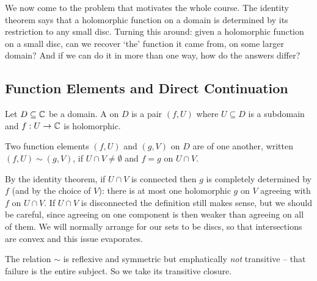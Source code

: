 \documentclass[a4paper]{scrartcl}
\begin{document}
We now come to the problem that motivates the whole course. The identity theorem says
that a holomorphic function on a domain is determined by its restriction to any small
disc. Turning this around: given a holomorphic function on a small disc, can we recover
`the' function it came from, on some larger domain? And if we can do it in more than one
way, how do the answers differ?

\subsection{Function Elements and Direct Continuation}

\begin{definition}
	Let $D \subseteq \mathbb{C}$ be a domain. A  on $D$ is a pair
	$(f, U)$ where $U \subseteq D$ is a subdomain and $f : U \to \mathbb{C}$ is holomorphic.
\end{definition}

\begin{definition}
	Two function elements $(f, U)$ and $(g, V)$ on $D$ are  of one another, written $(f, U) \sim (g, V)$, if $U \cap V \neq \emptyset$
	and $f = g$ on $U \cap V$.
\end{definition}

\begin{center}
\end{center}

By the identity theorem, if $U \cap V$ is connected then $g$ is completely determined by
$f$ (and by the choice of $V$): there is at most one holomorphic $g$ on $V$ agreeing with
$f$ on $U \cap V$. If $U \cap V$ is disconnected the definition still makes sense, but we
should be careful, since agreeing on one component is then weaker than agreeing on all of
them. We will normally arrange for our sets to be discs, so that intersections are convex
and this issue evaporates.

The relation $\sim$ is reflexive and symmetric but emphatically \emph{not} transitive --
that failure is the entire subject. So we take its transitive closure.
\end{document}
